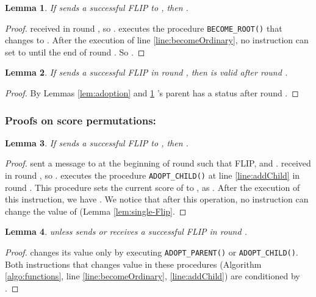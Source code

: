\documentclass[twocolumn]{article}
\newtheorem{lemma}{Lemma}
\newcommand{\depends}[1]{}
\begin{document}
\begin{lemma}
\label{lem:received-FLIP}
  If  sends a successful FLIP to , then .
\depends{\ref{lem:2FLIPs}, \ref{lem:single-Flip}}
\end{lemma}

\begin{proof}
 received  in round , so .
 executes the procedure \texttt{BECOME\_ROOT()} 
that changes  to . 
After the execution of line \ref{line:becomeOrdinary}, 
no instruction can set  to 
until the end of round . So .
 \end{proof}


\begin{lemma}
  \label{lem:FLIP-valid}
  If  sends a successful FLIP in round , then  is valid after round .
\depends{\ref{lem:adoption}, \ref{lem:received-FLIP}}
\end{lemma}

\begin{proof}
By Lemmas \ref{lem:adoption} and \ref{lem:received-FLIP} 's parent has a status  after round .
 \end{proof}

\subsubsection{Proofs on score permutations:}



\begin{lemma}
\label{lem:received-FLIP-score}
  If  sends a successful FLIP to , then .
\depends{\ref{lem:2FLIPs}, \ref{lem:single-Flip}}
\end{lemma}

\begin{proof}
 sent a message  to  at the beginning of round  
such that  FLIP,   and . 
 received  in round , so .
 executes the procedure
\texttt{ADOPT\_CHILD()} at line \ref{line:addChild} 
in round . 
This procedure sets the current score of  
to , as .
After the execution of this instruction, we have
. 
We notice that after this operation, no instruction 
can change the value of   
(Lemma \ref{lem:single-Flip}.
 \end{proof}



\begin{lemma}
\label{lem:NO-FLIP-SCORE}
 unless  sends 
or receives a successful FLIP in round .
\depends{\ref{lem:change_score}}
\end{lemma}
\begin{proof}

 changes its  value only by executing \texttt{ADOPT\_PARENT()} or \texttt{ADOPT\_CHILD()}. Both instructions that changes  value in these procedures (Algorithm \ref{algo:functions}, line \ref{line:becomeOrdinary}, \ref{line:addChild}) are conditioned by .
\end{proof}
\end{document}
